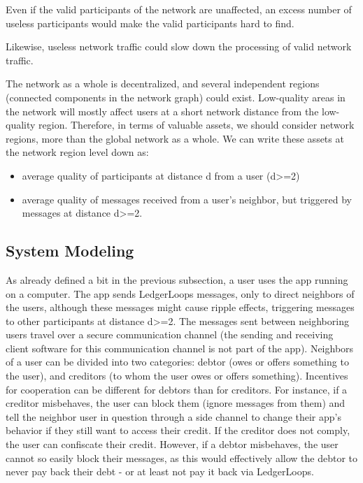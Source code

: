\documentclass[11pt,twoside,a4paper]{article}
\begin{document}
Even if the valid participants of the network are unaffected, an excess number of useless participants would make the valid participants hard to find.

Likewise, useless network traffic could slow down the processing of valid network traffic.

The network as a whole is decentralized, and several independent regions (connected components in the network graph) could exist.
Low-quality areas in the network will mostly affect users at a short network distance from the low-quality region. Therefore,
in terms of valuable assets, we should consider network regions, more than the global network as a whole. We can write these assets at
the network region level down as:

\begin{itemize}
\item average quality of participants at distance d from a user (d>=2)
\item average quality of messages received from a user's neighbor, but triggered by messages at distance d>=2.
\end{itemize}

\subsection{System Modeling}
As already defined a bit in the previous subsection, a user uses the app running on a computer. The app sends LedgerLoops messages, only to direct neighbors of the users, although these messages might cause ripple effects, triggering messages to other participants at distance d>=2.
The messages sent between neighboring users travel over a secure communication channel (the sending and receiving client software for this communication channel is not part of the app). Neighbors of a user can be divided into two categories: debtor (owes or offers something to the user), and creditors (to whom the user owes or offers something). Incentives for cooperation can be different for debtors than for creditors. For instance, if a creditor misbehaves, the user can block them (ignore messages from them) and tell the neighbor user in question through a side channel to change their app's behavior if they still want to access their credit. If the creditor does not comply, the user can confiscate their credit. However, if a debtor misbehaves, the user cannot so easily block their messages, as this would effectively allow the debtor to never pay back their debt - or at least not pay it back via LedgerLoops.
\end{document}
